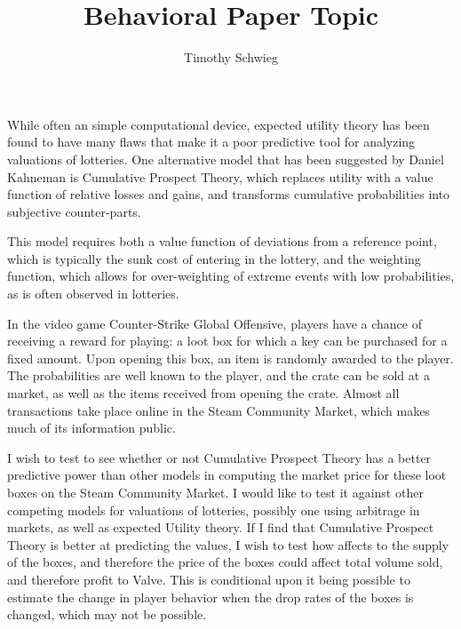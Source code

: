 \documentclass[10pt]{paper}
\title{Behavioral Paper Topic}
\author{Timothy Schwieg}
\begin{document}
{ 
While often an simple computational device, expected utility theory has been
found to have many flaws that make it a poor predictive tool for analyzing
valuations of lotteries. One alternative model that has been suggested by Daniel
Kahneman is Cumulative Prospect Theory, which replaces utility with a value
function of relative losses and gains, and transforms cumulative probabilities
into subjective counter-parts.

This model requires both a value function of deviations from a reference point,
which is typically the sunk cost of entering in the lottery, and the weighting
function, which allows for over-weighting of extreme events with low
probabilities, as is often observed in lotteries.

In the video game Counter-Strike Global Offensive, players have a chance of
receiving a reward for playing: a loot box for which a key can be purchased for
a fixed amount. Upon opening this box, an item is randomly awarded to the
player. The probabilities are well known to the player, and the crate can be
sold at a market, as well as the items received from opening the crate. Almost
all transactions take place online in the Steam Community Market, which makes
much of its information public.

I wish to test to see whether or not Cumulative Prospect Theory has a better
predictive power than other models in computing the market price for these loot
boxes on the Steam Community Market. I would like to test it against other
competing models for valuations of lotteries, possibly one using arbitrage in
markets, as well as expected Utility theory. If I find that Cumulative Prospect
Theory is better at predicting the values, I wish to test how affects to the
supply of the boxes, and therefore the price of the boxes could affect total
volume sold, and therefore profit to Valve. This is conditional upon it being
possible to estimate the change in player behavior when the drop rates of the
boxes is changed, which may not be possible.

}
\end{document}
